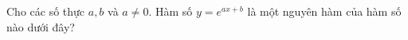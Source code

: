 \begin{ex}
Cho các số thực $a,b$ và $a\ne0$. Hàm số $y=e^{ax+b}$ là một nguyên hàm của hàm số nào dưới đây?
\end{ex}
